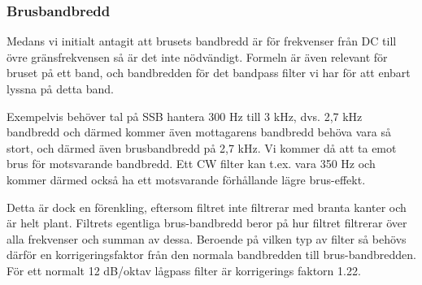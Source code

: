 \subsubsection{Brusbandbredd}
\begin{rev-nytt}[MAD]

Medans vi initialt antagit att brusets bandbredd är för frekvenser
från DC till övre gränsfrekvensen så är det inte nödvändigt. Formeln är även
relevant för bruset på ett band, och bandbredden för det bandpass filter vi har
för att enbart lyssna på detta band.

Exempelvis behöver tal på SSB hantera 300 Hz till 3 kHz, dvs. 2,7 kHz
bandbredd och därmed kommer även mottagarens bandbredd behöva vara så stort,
och därmed även brusbandbredd på 2,7 kHz. Vi kommer då att ta emot brus för
motsvarande bandbredd. Ett CW filter kan t.ex. vara 350 Hz och kommer därmed
också ha ett motsvarande förhållande lägre brus-effekt.

Detta är dock en förenkling, eftersom filtret inte filtrerar med branta kanter
och är helt plant. Filtrets egentliga brus-bandbredd beror på hur filtret
filtrerar över alla frekvenser och summan av dessa. Beroende på vilken typ av
filter så behövs därför en korrigeringsfaktor från den normala bandbredden
till brus-bandbredden. För ett normalt 12 dB/oktav lågpass filter är
korrigerings faktorn 1.22.

\end{rev-nytt}
